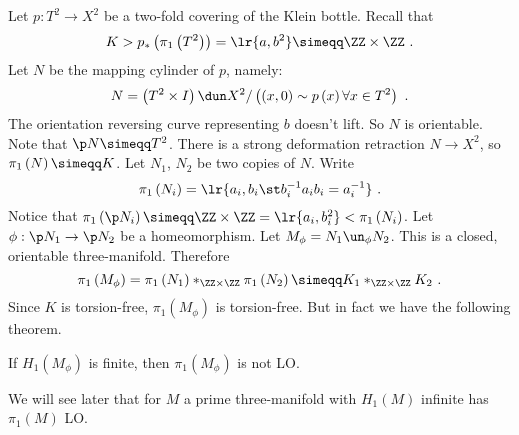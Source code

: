 Let $p : T^2 \to X^2$ be a two-fold covering of the Klein bottle.
Recall that
\begin{equation}
K > p_*\left(\pi_1\left(T^2\right)\right) = \lr{a , b^2} \simeqq \ZZ\times \ZZ
\ .
\end{equation}
Let $N$ be the mapping cylinder of $p$, namely:
\begin{equation}
N = \left(T^2 \times I\right)\dun X^2 / \left( \left(x , 0\right)\sim p\left(x\right)
\forall x\in T^2\right) \ .
\end{equation}
The orientation reversing curve representing $b$ doesn't lift. So $N$ is orientable.
Note that $\p N \simeqq T^2$.
There is a strong deformation retraction $N\to X^2$, so $\pi_1\left(N\right)\simeqq K$.
Let $N_1$, $N_2$ be two copies of $N$.
Write
\begin{equation}
\pi_1\left(N_i\right) = \lr{a_i , b_i \st b_i^{-1} a_i b_i = a_i^{-1}}
\ .
\end{equation}
Notice that 
$\pi_1\left(\p N_i\right)\simeqq \ZZ\times \ZZ = \lr{a_i , b_i^2} < \pi_1\left(N_i\right)$.
Let $\phi : \p N_1 \to \p N_2$ be a homeomorphism.
Let $M_\phi = N_1 \un_\phi N_2$. This is a closed, orientable three-manifold. Therefore
\begin{equation}
\pi_1\left(M_\phi\right) = \pi_1\left(N_1\right)*_{\ZZ\times \ZZ}
\pi_1\left(N_2\right)\simeqq K_1 *_{\ZZ\times \ZZ} K_2 \ .
\end{equation}
Since $K$ is torsion-free, $\pi_1\left(M_\phi\right)$ is torsion-free.
But in fact we have the following theorem.

\begin{thm}
If $H_1\left(M_\phi\right)$ is finite, then $\pi_1\left(M_\phi\right)$ is not LO.
\label{thm:1.16}
\end{thm}

\begin{rmk}
We will see later that for $M$ a prime three-manifold with $H_1\left(M\right)$ infinite
has $\pi_1\left(M\right)$ LO.
\end{rmk}

